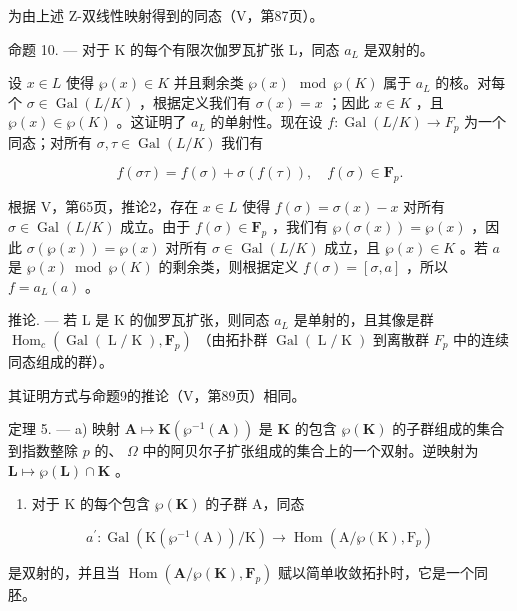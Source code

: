 为由上述 Z-双线性映射得到的同态（V，第87页）。

命题 10. --- 对于 K 的每个有限次伽罗瓦扩张 L，同态 \(a_{L}\) 是双射的。

设 \(x \in L\) 使得 \(\wp(x) \in K\) 并且剩余类 \(\wp(x) \mod \wp(K)\) 属于 \(a_L\) 的核。对每个 \(\sigma \in \operatorname{Gal}(L/K)\) ，根据定义我们有 \(\sigma(x) = x\) ；因此 \(x \in K\) ，且 \(\wp(x) \in \wp(K)\) 。这证明了 \(a_L\) 的单射性。现在设 \(f: \operatorname{Gal}(L/K) \to F_p\) 为一个同态；对所有 \(\sigma, \tau \in \operatorname{Gal}(L/K)\) 我们有

\[
f (\sigma \tau) = f (\sigma) + \sigma (f (\tau)), \quad f (\sigma) \in \mathbf {F} _ {p}.
\]

根据 V，第65页，推论2，存在 \(x \in L\) 使得 \(f(\sigma) = \sigma(x) - x\) 对所有 \(\sigma \in \operatorname{Gal}(L/K)\) 成立。由于 \(f(\sigma) \in \mathbf{F}_p\) ，我们有 \(\wp(\sigma(x)) = \wp(x)\) ，因此 \(\sigma(\wp(x)) = \wp(x)\) 对所有 \(\sigma \in \operatorname{Gal}(L/K)\) 成立，且 \(\wp(x) \in K\) 。若 \(a\) 是 \(\wp(x) \bmod \wp(K)\) 的剩余类，则根据定义 \(f(\sigma) = [\sigma, a]\) ，所以 \(f = a_L(a)\) 。

推论. --- 若 L 是 K 的伽罗瓦扩张，则同态 \(a_{L}\) 是单射的，且其像是群 \(\operatorname{Hom}_{c}(\operatorname{Gal}(\operatorname{L}/\operatorname{K}), \mathbf{F}_{p})\) （由拓扑群 \(\operatorname{Gal}(\operatorname{L}/\operatorname{K})\) 到离散群 \(F_{p}\) 中的连续同态组成的群）。

其证明方式与命题9的推论（V，第89页）相同。

定理 5. --- a) 映射 \(\mathbf{A} \mapsto \mathbf{K}(\wp^{-1}(\mathbf{A}))\) 是 \(\mathbf{K}\) 的包含 \(\wp(\mathbf{K})\) 的子群组成的集合到指数整除 \(p\) 的、 \(\Omega\) 中的阿贝尔子扩张组成的集合上的一个双射。逆映射为 \(\mathbf{L} \mapsto \wp(\mathbf{L}) \cap \mathbf{K}\) 。

\begin{enumerate}
\def\labelenumi{\alph{enumi})}
\setcounter{enumi}{1}
\tightlist
\item
  对于 K 的每个包含 \(\wp(\mathbf{K})\) 的子群 A，同态
\end{enumerate}

\[
a ^ {\prime}: \operatorname{Gal} \left(\mathrm{K} \left(\wp^ {- 1} (\mathrm{A})\right) / \mathrm{K}\right)\rightarrow \operatorname{Hom} \left(\mathrm{A} / \wp (\mathrm{K}), \mathrm{F} _ {p}\right)
\]

是双射的，并且当 \(\operatorname{Hom}(\mathbf{A}/\wp(\mathbf{K}), \mathbf{F}_p)\) 赋以简单收敛拓扑时，它是一个同胚。

